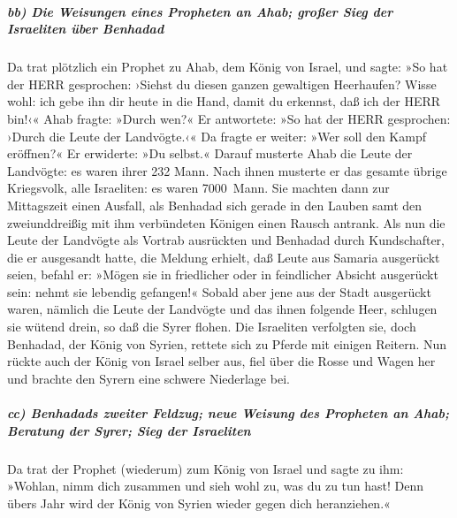 \hypertarget{bb-die-weisungen-eines-propheten-an-ahab-grouxdfer-sieg-der-israeliten-uxfcber-benhadad}{%
\subparagraph{bb) Die Weisungen eines Propheten an Ahab; großer Sieg der
Israeliten über
Benhadad}\label{bb-die-weisungen-eines-propheten-an-ahab-grouxdfer-sieg-der-israeliten-uxfcber-benhadad}}

Da trat plötzlich ein Prophet zu Ahab, dem König von
Israel, und sagte: »So hat der HERR gesprochen: ›Siehst du diesen ganzen
gewaltigen Heerhaufen? Wisse wohl: ich gebe ihn dir heute in die Hand,
damit du erkennst, daß ich der HERR bin!‹« Ahab fragte:
»Durch wen?« Er antwortete: »So hat der HERR gesprochen: ›Durch die
Leute der Landvögte.‹« Da fragte er weiter: »Wer soll den Kampf
eröffnen?« Er erwiderte: »Du selbst.« Darauf musterte
Ahab die Leute der Landvögte: es waren ihrer 232 Mann. Nach ihnen
musterte er das gesamte übrige Kriegsvolk, alle Israeliten: es waren
7000~Mann. Sie machten dann zur Mittagszeit einen
Ausfall, als Benhadad sich gerade in den Lauben samt den zweiunddreißig
mit ihm verbündeten Königen einen Rausch antrank. Als nun
die Leute der Landvögte als Vortrab ausrückten und Benhadad durch
Kundschafter, die er ausgesandt hatte, die Meldung erhielt, daß Leute
aus Samaria ausgerückt seien, befahl er: »Mögen sie in
friedlicher oder in feindlicher Absicht ausgerückt sein: nehmt sie
lebendig gefangen!« Sobald aber jene aus der Stadt
ausgerückt waren, nämlich die Leute der Landvögte und das ihnen folgende
Heer, schlugen sie wütend drein, so daß die Syrer flohen.
Die Israeliten verfolgten sie, doch Benhadad, der König von Syrien,
rettete sich zu Pferde mit einigen Reitern. Nun rückte
auch der König von Israel selber aus, fiel über die Rosse und Wagen her
und brachte den Syrern eine schwere Niederlage bei.

\hypertarget{cc-benhadads-zweiter-feldzug-neue-weisung-des-propheten-an-ahab-beratung-der-syrer-sieg-der-israeliten}{%
\subparagraph{cc) Benhadads zweiter Feldzug; neue Weisung des Propheten
an Ahab; Beratung der Syrer; Sieg der
Israeliten}\label{cc-benhadads-zweiter-feldzug-neue-weisung-des-propheten-an-ahab-beratung-der-syrer-sieg-der-israeliten}}

Da trat der Prophet (wiederum) zum König von Israel und
sagte zu ihm: »Wohlan, nimm dich zusammen und sieh wohl zu, was du zu
tun hast! Denn übers Jahr wird der König von Syrien wieder gegen dich
heranziehen.«

